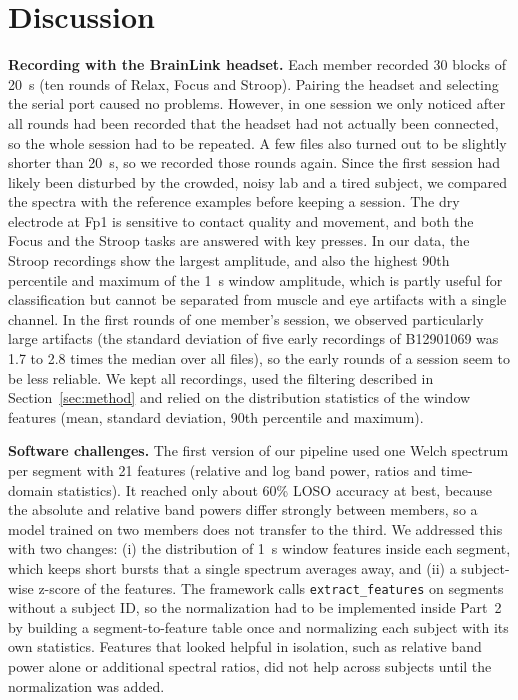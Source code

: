 \section{Discussion}\label{sec:discussion}

\textbf{Recording with the BrainLink headset.} Each member recorded 30 blocks of 20~s (ten rounds of Relax, Focus and Stroop). Pairing the headset and selecting the serial port caused no problems. However, in one session we only noticed after all rounds had been recorded that the headset had not actually been connected, so the whole session had to be repeated. A few files also turned out to be slightly shorter than 20~s, so we recorded those rounds again. Since the first session had likely been disturbed by the crowded, noisy lab and a tired subject, we compared the spectra with the reference examples before keeping a session. The dry electrode at Fp1 is sensitive to contact quality and movement, and both the Focus and the Stroop tasks are answered with key presses. In our data, the Stroop recordings show the largest amplitude, and also the highest 90th percentile and maximum of the 1~s window amplitude, which is partly useful for classification but cannot be separated from muscle and eye artifacts with a single channel. In the first rounds of one member's session, we observed particularly large artifacts (the standard deviation of five early recordings of B12901069 was 1.7 to 2.8 times the median over all files), so the early rounds of a session seem to be less reliable. We kept all recordings, used the filtering described in Section~\ref{sec:method} and relied on the distribution statistics of the window features (mean, standard deviation, 90th percentile and maximum).

\textbf{Software challenges.} The first version of our pipeline used one Welch spectrum per segment with 21 features (relative and log band power, ratios and time-domain statistics). It reached only about 60\% LOSO accuracy at best, because the absolute and relative band powers differ strongly between members, so a model trained on two members does not transfer to the third. We addressed this with two changes: (i) the distribution of 1~s window features inside each segment, which keeps short bursts that a single spectrum averages away, and (ii) a subject-wise z-score of the features. The framework calls \texttt{extract\_features} on segments without a subject ID, so the normalization had to be implemented inside Part~2 by building a segment-to-feature table once and normalizing each subject with its own statistics. Features that looked helpful in isolation, such as relative band power alone or additional spectral ratios, did not help across subjects until the normalization was added.

